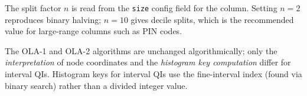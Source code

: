 \documentclass[12pt,a4paper]{article}
\begin{document}
The split factor $n$ is read from the \texttt{size} config field for the column.
Setting $n{=}2$ reproduces binary halving; $n{=}10$ gives decile splits, which
is the recommended value for large-range columns such as PIN codes.

The OLA-1 and OLA-2 algorithms are unchanged algorithmically; only the
\emph{interpretation} of node coordinates and the \emph{histogram key
computation} differ for interval QIs. Histogram keys for interval QIs use the
fine-interval index (found via binary search) rather than a divided integer
value.
\end{document}

